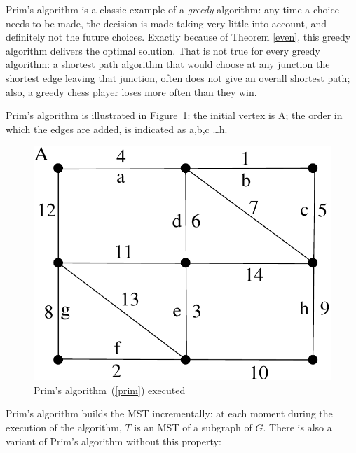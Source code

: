 Prim's algorithm is a classic example of a {\em greedy} algorithm: any
time a choice needs to be made, the decision is made taking very
little into account, and definitely not the future choices. Exactly
because of Theorem \ref{even}, this greedy algorithm delivers the
optimal solution. That is not true for every greedy algorithm: a
shortest path algorithm that would choose at any junction the shortest
edge leaving that junction, often does not give an overall shortest
path; also, a greedy chess player loses more often than they win.

Prim's algorithm is illustrated in Figure~\ref{prim1}: the initial
vertex is A; the order in which the edges are added, is indicated as
a,b,c \ldots h.

\begin{figure}[ht]
\begin{center}
\includegraphics[width=0.3\linewidth,keepaspectratio]{prim1} %
\end{center}
\caption{Prim's algorithm~(\ref{prim}) executed \label{prim1}}
\end{figure}


Prim's algorithm builds the MST incrementally: at each moment during
the execution of the algorithm, $T$ is an MST of a subgraph of
$G$. There is also a variant of Prim's algorithm without this
property:


